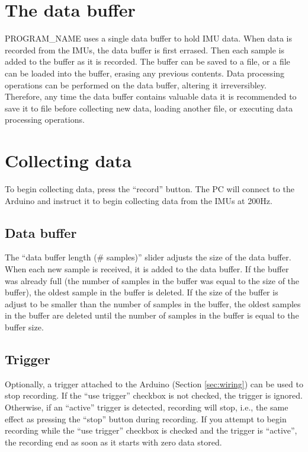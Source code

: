 \documentclass[11pt,letterpaper,article,oneside]{memoir}
\newcommand{\name}{PROGRAM\_NAME}
\begin{document}
\section{The data buffer}
\name{} uses a single data buffer to hold IMU data. When data is recorded from
the IMUs, the data buffer is first errased. Then each sample is added to the
buffer as it is recorded. The buffer can be saved to a file, or a file can be
loaded into the buffer, erasing any previous contents. Data processing
operations can be performed on the data buffer, altering it irreversibley.
Therefore, any time the data buffer contains valuable data it is recommended to
save it to file before collecting new data, loading another file, or executing
data processing operations.


\section{Collecting data}

To begin collecting data, press the ``record'' button.
The PC will connect to the Arduino and instruct it to begin collecting data from
the IMUs at 200Hz. 


\subsection{Data buffer}

The ``data buffer length (\# samples)'' slider adjusts the size of the data
buffer. When each new sample is received, it is added to the data buffer. If the
buffer was already full (the number of samples in the buffer was equal to the
size of the buffer), the oldest sample in the buffer is deleted. If the size of
the buffer is adjust to be smaller than the number of samples in the buffer, the
oldest samples in the buffer are deleted until the number of samples in the
buffer is equal to the buffer size.


\subsection{Trigger}

Optionally, a trigger attached to the Arduino (Section \ref{sec:wiring}) can be
used to stop recording.  If the ``use trigger'' checkbox is not checked, the
trigger is ignored. Otherwise, if an ``active'' trigger is detected, recording
will stop, i.e., the same effect as pressing the ``stop'' button during
recording. If you attempt to begin recording while the ``use trigger'' checkbox
is checked and the trigger is ``active'', the recording end as soon as it starts
with zero data stored.
\end{document}
